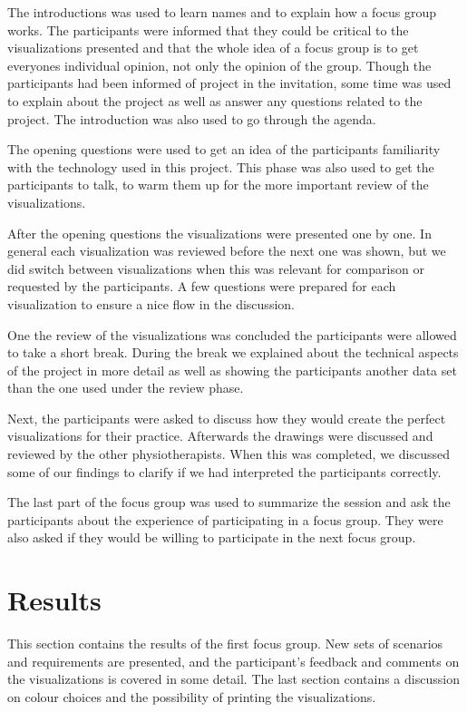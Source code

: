 The introductions was used to learn names and to explain how a focus group works. The participants were informed that they could be critical to the visualizations presented and that the whole idea of a focus group is to get everyones individual opinion, not only the opinion of the group. Though the participants had been informed of project in the invitation, some time was used to explain about the project as well as answer any questions related to the project. The introduction was also used to go through the agenda.

The opening questions were used to get an idea of the participants familiarity with the technology used in this project. This phase was also used to get the participants to talk, to warm them up for the more important review of the visualizations.

After the opening questions the visualizations were presented one by one. In general each visualization was reviewed before the next one was shown, but we did switch between visualizations when this was relevant for comparison or requested by the participants. A few questions were prepared for each visualization to ensure a nice flow in the discussion.

One the review of the visualizations was concluded the participants were allowed to take a short break. During the break we explained about the technical aspects of the project in more detail as well as showing the participants another data set than the one used under the review phase. %

Next, the participants were asked to discuss how they would create the perfect visualizations for their practice. Afterwards the drawings were discussed and reviewed by the other physiotherapists. When this was completed, we discussed some of our findings to clarify if we had interpreted the participants correctly.

The last part of the focus group was used to summarize the session and ask the participants about the experience of participating in a focus group. They were also asked if they would be willing to participate in the next focus group.

\section{Results}
This section contains the results of the first focus group. New sets of scenarios and requirements are presented, and the participant's feedback and comments on the visualizations is covered in some detail. The last section contains a discussion on colour choices and the possibility of printing the visualizations.

